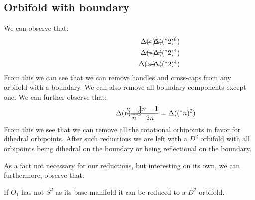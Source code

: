 \subsection{Orbifold with boundary}\label{orbifold_with_boundary}
We can observe that:
\begin{align}
\hspace{3cm}\Delta(\circ) =& \hspace{-1cm} &-2& \hspace{-1cm} &= \Delta((^\ast 2)^8) \\
\hspace{3cm}\Delta(\ast) =& \hspace{-1cm} &-1& \hspace{-1cm} &= \Delta((^\ast 2)^4) \\
\hspace{3cm}\Delta(\times) =& \hspace{-1cm} &-1& \hspace{-1cm} &= \Delta((^\ast 2)^4)
\end{align}
From this we can see that we can remove handles and cross-caps 
from any orbifold with a boundary. 
We can also remove all boundary components except one.         
We can further observe that:
\begin{align}
\hspace{3cm}\Delta(n) =& \hspace{-1cm} &\frac{n-1}{n}& \hspace{-1cm} 
&= 2\frac{n-1}{2n} &= \Delta((^\ast n)^2)\label{third_reduction}
\end{align}
From this we see that we can remove all the rotational orbipoints in favor for 
dihedral orbipoints.
After such reductions we are left with a $D^2$ orbifold with all orbipoints being dihedral on 
the boundary or being reflectional on the boundary. 

As a fact not necessary for our reductions, but interesting on its own, we can furthermore, 
observe that:
\begin{observation}
If $O_1$ has not $S^2$ as its base manifold it can be reduced to a $D^2$-orbifold.
\end{observation}
